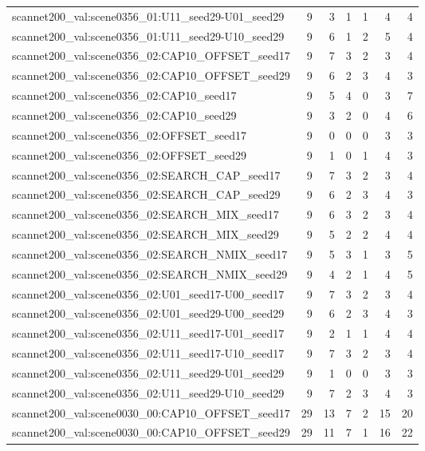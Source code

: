 \begin{table}[t]
\begin{tabular}{lrrrrrr}
scannet200\_val:scene0356\_01:U11\_seed29-U01\_seed29 & 9 & 3 & 1 & 1 & 4 & 4 \\
scannet200\_val:scene0356\_01:U11\_seed29-U10\_seed29 & 9 & 6 & 1 & 2 & 5 & 4 \\
scannet200\_val:scene0356\_02:CAP10\_OFFSET\_seed17 & 9 & 7 & 3 & 2 & 3 & 4 \\
scannet200\_val:scene0356\_02:CAP10\_OFFSET\_seed29 & 9 & 6 & 2 & 3 & 4 & 3 \\
scannet200\_val:scene0356\_02:CAP10\_seed17 & 9 & 5 & 4 & 0 & 3 & 7 \\
scannet200\_val:scene0356\_02:CAP10\_seed29 & 9 & 3 & 2 & 0 & 4 & 6 \\
scannet200\_val:scene0356\_02:OFFSET\_seed17 & 9 & 0 & 0 & 0 & 3 & 3 \\
scannet200\_val:scene0356\_02:OFFSET\_seed29 & 9 & 1 & 0 & 1 & 4 & 3 \\
scannet200\_val:scene0356\_02:SEARCH\_CAP\_seed17 & 9 & 7 & 3 & 2 & 3 & 4 \\
scannet200\_val:scene0356\_02:SEARCH\_CAP\_seed29 & 9 & 6 & 2 & 3 & 4 & 3 \\
scannet200\_val:scene0356\_02:SEARCH\_MIX\_seed17 & 9 & 6 & 3 & 2 & 3 & 4 \\
scannet200\_val:scene0356\_02:SEARCH\_MIX\_seed29 & 9 & 5 & 2 & 2 & 4 & 4 \\
scannet200\_val:scene0356\_02:SEARCH\_NMIX\_seed17 & 9 & 5 & 3 & 1 & 3 & 5 \\
scannet200\_val:scene0356\_02:SEARCH\_NMIX\_seed29 & 9 & 4 & 2 & 1 & 4 & 5 \\
scannet200\_val:scene0356\_02:U01\_seed17-U00\_seed17 & 9 & 7 & 3 & 2 & 3 & 4 \\
scannet200\_val:scene0356\_02:U01\_seed29-U00\_seed29 & 9 & 6 & 2 & 3 & 4 & 3 \\
scannet200\_val:scene0356\_02:U11\_seed17-U01\_seed17 & 9 & 2 & 1 & 1 & 4 & 4 \\
scannet200\_val:scene0356\_02:U11\_seed17-U10\_seed17 & 9 & 7 & 3 & 2 & 3 & 4 \\
scannet200\_val:scene0356\_02:U11\_seed29-U01\_seed29 & 9 & 1 & 0 & 0 & 3 & 3 \\
scannet200\_val:scene0356\_02:U11\_seed29-U10\_seed29 & 9 & 7 & 2 & 3 & 4 & 3 \\
scannet200\_val:scene0030\_00:CAP10\_OFFSET\_seed17 & 29 & 13 & 7 & 2 & 15 & 20 \\
scannet200\_val:scene0030\_00:CAP10\_OFFSET\_seed29 & 29 & 11 & 7 & 1 & 16 & 22 \\

\end{tabular}
\end{table}
